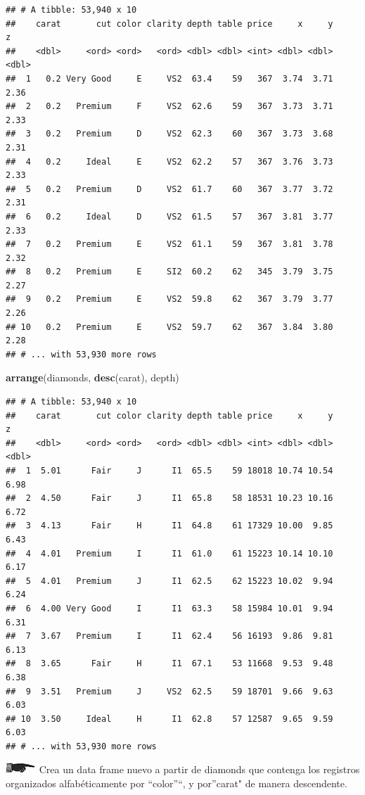 \documentclass[]{book}
\newenvironment{Shaded}{\begin{snugshade}}{\end{snugshade}}
\newcommand{\KeywordTok}[1]{\textcolor[rgb]{0.13,0.29,0.53}{\textbf{#1}}}
\newcommand{\NormalTok}[1]{#1}
\theoremstyle{definition}
\theoremstyle{definition}
\theoremstyle{definition}
\theoremstyle{remark}
\begin{document}
\begin{verbatim}
## # A tibble: 53,940 x 10
##    carat       cut color clarity depth table price     x     y     z
##    <dbl>     <ord> <ord>   <ord> <dbl> <dbl> <int> <dbl> <dbl> <dbl>
##  1   0.2 Very Good     E     VS2  63.4    59   367  3.74  3.71  2.36
##  2   0.2   Premium     F     VS2  62.6    59   367  3.73  3.71  2.33
##  3   0.2   Premium     D     VS2  62.3    60   367  3.73  3.68  2.31
##  4   0.2     Ideal     E     VS2  62.2    57   367  3.76  3.73  2.33
##  5   0.2   Premium     D     VS2  61.7    60   367  3.77  3.72  2.31
##  6   0.2     Ideal     D     VS2  61.5    57   367  3.81  3.77  2.33
##  7   0.2   Premium     E     VS2  61.1    59   367  3.81  3.78  2.32
##  8   0.2   Premium     E     SI2  60.2    62   345  3.79  3.75  2.27
##  9   0.2   Premium     E     VS2  59.8    62   367  3.79  3.77  2.26
## 10   0.2   Premium     E     VS2  59.7    62   367  3.84  3.80  2.28
## # ... with 53,930 more rows
\end{verbatim}

\begin{Shaded}
\begin{Highlighting}[]
\KeywordTok{arrange}\NormalTok{(diamonds, }\KeywordTok{desc}\NormalTok{(carat), depth)}
\end{Highlighting}
\end{Shaded}

\begin{verbatim}
## # A tibble: 53,940 x 10
##    carat       cut color clarity depth table price     x     y     z
##    <dbl>     <ord> <ord>   <ord> <dbl> <dbl> <int> <dbl> <dbl> <dbl>
##  1  5.01      Fair     J      I1  65.5    59 18018 10.74 10.54  6.98
##  2  4.50      Fair     J      I1  65.8    58 18531 10.23 10.16  6.72
##  3  4.13      Fair     H      I1  64.8    61 17329 10.00  9.85  6.43
##  4  4.01   Premium     I      I1  61.0    61 15223 10.14 10.10  6.17
##  5  4.01   Premium     J      I1  62.5    62 15223 10.02  9.94  6.24
##  6  4.00 Very Good     I      I1  63.3    58 15984 10.01  9.94  6.31
##  7  3.67   Premium     I      I1  62.4    56 16193  9.86  9.81  6.13
##  8  3.65      Fair     H      I1  67.1    53 11668  9.53  9.48  6.38
##  9  3.51   Premium     J     VS2  62.5    59 18701  9.66  9.63  6.03
## 10  3.50     Ideal     H      I1  62.8    57 12587  9.65  9.59  6.03
## # ... with 53,930 more rows
\end{verbatim}

\includegraphics{./imagenes/manicule2.jpg} Crea un data frame nuevo a
partir de diamonds que contenga los registros organizados
alfabéticamente por ``color''``, y por''carat" de manera descendente.
\end{document}
